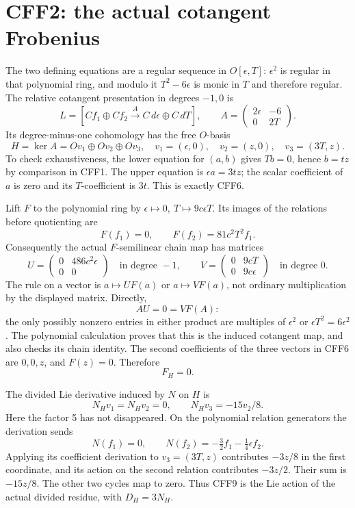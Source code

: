 \section{CFF2: the actual cotangent Frobenius}
The two defining equations are a regular sequence in \(O[\epsilon,T]\):
\(\epsilon^2\) is regular in that polynomial ring, and modulo it
\(T^2-6\epsilon\) is monic in \(T\) and therefore regular. The
relative cotangent presentation in degrees \(-1,0\) is
\[
 L=[C f_1\oplus C f_2 \xrightarrow{A}
                 C\,d\epsilon\oplus C\,dT],\qquad
 A=\begin{pmatrix}2\epsilon&-6\\0&2T\end{pmatrix}.
 \tag{CFF5}
\]
Its degree-minus-one cohomology has the free \(O\)-basis
\[
 H=\ker A=Ov_1\oplus Ov_2\oplus Ov_3,\quad
 v_1=(\epsilon,0),\quad v_2=(z,0),\quad v_3=(3T,z).
 \tag{CFF6}
\]
To check exhaustiveness, the lower equation for \((a,b)\) gives
\(Tb=0\), hence \(b=t z\) by comparison in CFF1. The upper equation
is \(\epsilon a=3t z\); the scalar coefficient of \(a\) is zero
and its \(T\)-coefficient is \(3t\). This is exactly CFF6.

Lift \(F\) to the polynomial ring by
\(\epsilon\mapsto0,\ T\mapsto9c\epsilon T\). Its images of the
relations before quotienting are
\[
 F(f_1)=0,\qquad F(f_2)=81c^2T^2f_1.
\]
Consequently the actual \(F\)-semilinear chain map has matrices
\[
 U=\begin{pmatrix}0&486c^2\epsilon\\0&0\end{pmatrix}
 \quad\text{in degree }-1,\qquad
 V=\begin{pmatrix}0&9cT\\0&9c\epsilon\end{pmatrix}
 \quad\text{in degree }0.
 \tag{CFF7}
\]
The rule on a vector is \(a\mapsto U F(a)\) or \(a\mapsto V F(a)\),
not ordinary multiplication by the displayed matrix. Directly,
\[
 AU=0=VF(A):
\]
the only possibly nonzero entries in either product are multiples
of \(\epsilon^2\) or \(\epsilon T^2=6\epsilon^2\).
The polynomial calculation proves that this is the induced
cotangent map, and also checks its chain identity.
The second coefficients of the three vectors in CFF6 are \(0,0,z\),
and \(F(z)=0\). Therefore
\[
                         F_H=0.
 \tag{CFF8}
\]

The divided Lie derivative induced by \(N\) on \(H\) is
\[
 N_Hv_1=N_Hv_2=0,\qquad N_Hv_3=-15v_2/8.
 \tag{CFF9}
\]
Here the factor 5 has not disappeared. On the polynomial relation
generators the derivation sends
\[
 N(f_1)=0,\qquad N(f_2)=-\tfrac32 f_1-\tfrac14\epsilon f_2.
\]
Applying its coefficient derivation to \(v_3=(3T,z)\) contributes
\(-3z/8\) in the first coordinate, and its action on the second
relation contributes \(-3z/2\). Their sum is \(-15z/8\).
The other two cycles map to zero. Thus CFF9 is the Lie action
of the actual divided residue, with \(D_H=3N_H\).


